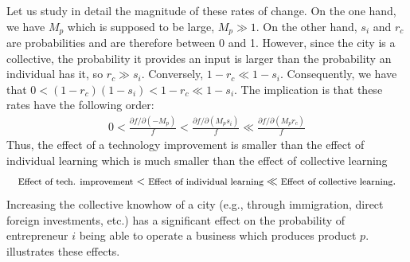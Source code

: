 \documentclass[12pt]{article}
\begin{document}
Let us study in detail the magnitude of these rates of change. On the one hand, we have $M_p$ which is supposed to be large, $M_p\gg 1$. On the other hand, $s_i$ and $r_c$ are probabilities and are therefore between 0 and 1. However, since the city is a collective, the probability it provides an input is larger than the probability an individual has it, so $r_c\gg s_i$. Conversely, $1-r_c\ll 1- s_i$. Consequently, we have that $0 < (1-r_c)(1-s_i) < 1-r_c \ll 1 - s_i$. The implication is that these rates have the following order:
\begin{align}
	0<\frac{\partial f/\partial (-M_p)}{f} < \frac{\partial f/\partial (M_p s_i)}{f} \ll \frac{\partial f/\partial (M_p r_c)}{f}
	\label{eq_comparison}
\end{align}
Thus, the effect of a technology improvement is smaller than the effect of individual learning which is much smaller than the effect of collective learning 
$$\text{{\footnotesize Effect of tech. improvement}}<\text{{\footnotesize Effect of individual learning}}\ll\text{{\footnotesize Effect of collective learning}}.$$ Increasing the collective knowhow of a city (e.g., through immigration, direct foreign investments, etc.) has a significant effect on the probability of entrepreneur $i$ being able to operate a business which produces product $p$.  illustrates these effects.
\end{document}
